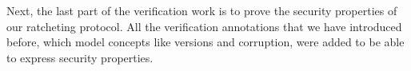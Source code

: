 Next, the last part of the verification work is to prove the security properties of our ratcheting protocol.
All the verification annotations that we have introduced before, which model concepts like versions and corruption, were added to be able to express security properties.



